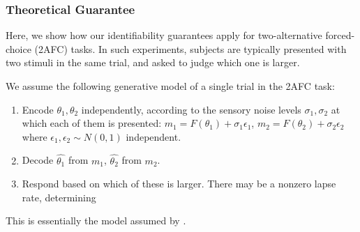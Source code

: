 \documentclass[si.tex]{subfiles}
\begin{document}
\subsubsection{Theoretical Guarantee}

Here, we show how our identifiability guarantees apply for two-alternative forced-choice (2AFC) tasks.
In such experiments, subjects are typically presented with two stimuli in the same trial, and asked to judge which one is larger.

We assume the following generative model of a single trial in the 2AFC task:
\begin{enumerate}
    \item Encode $\theta_1, \theta_2$ independently, according to the sensory noise levels $\sigma_1, \sigma_2$ at which each of them is presented: $m_1 = F(\theta_1) + \sigma_1 \epsilon_1$, $m_2 = F(\theta_2) + \sigma_2 \epsilon_2$ where $\epsilon_1, \epsilon_2 \sim N(0,1)$ independent.
    \item Decode $\widehat{\theta_1}$ from $m_1$, $\widehat{\theta_2}$ from $m_2$.
    \item Respond based on which of these is larger. There may be a nonzero lapse rate, determining 
\end{enumerate}
This is essentially the model assumed by \citet{Girshick2011CardinalRV, Stocker2005}.
\end{document}
